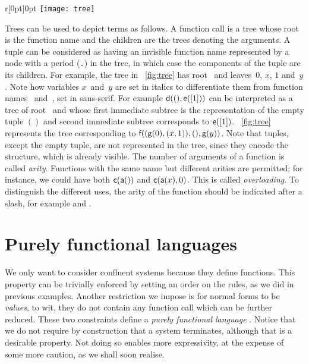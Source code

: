 %
\begin{wrapfigure}[8]{r}[0pt]{0pt}
\centering
\texttt{[image: tree]}%
\caption{\label{fig:tree}}
\end{wrapfigure}
Trees can be used to depict terms as follows. A function call is a
tree whose root is the function name and the children are the trees
denoting the arguments. A tuple can be considered as having an
invisible function name represented by a node with a period
(\texttt{.}) in the tree, in which case the components of the tuple
are its children. For example, the tree in \fig~\vref{fig:tree} has
root~ and leaves~\(0\), \(x\), \(1\) and~\(y\). Note how
variables \(x\)~and~\(y\) are set in italics to differentiate them
from function names ~and~, set in sans\hyp{}serif. For
example \(\textsf{d}((), \textsf{e}([1]))\) can be interpreted as a tree of
root~ and whose first immediate subtree is the representation
of the empty tuple \(()\) and second immediate subtree corresponds to
\(\textsf{e}([1])\). \Fig~\ref{fig:tree} represents the tree
corresponding to \(\textsf{f}((\textsf{g}(0),(x,1)),(),\textsf{g}(y))\). Note
that tuples, except the empty tuple, are not represented in the tree,
since they encode the structure, which is already visible. The number
of arguments of a function is called \emph{arity}. Functions with the same name but different arities
are permitted; for instance, we could have both \(\textsf{c}(\textsf{a}())\)
and \(\textsf{c}(\textsf{a}(x),0)\). This is called
\emph{overloading}. To
distinguish the different uses, the arity of the function should be
indicated after a slash, for example  and .

\section{Purely functional languages}
\label{sec:functional}

We only want to consider confluent systems because they define
functions. This property can be trivially enforced by setting an order
on the rules, as we did in previous examples. Another restriction we
impose is for normal forms to be \emph{values}, to wit, they do not contain any function call which
can be further reduced. These two constraints define a \emph{purely
  functional
  language} \citep{Hughes_1989,Hinsen_2009}. Notice that we do not require by construction that a
system terminates, although that is a desirable property. Not doing so
enables more expressivity, at the expense of some more caution, as we
shall soon realise.


